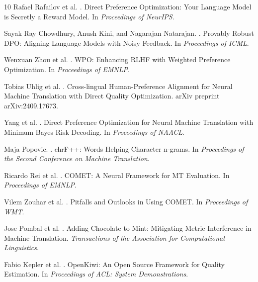 \begin{thebibliography}{10}
Rafael Rafailov et al.
.
\newblock Direct Preference Optimization: Your Language Model is Secretly a Reward Model.
\newblock In \emph{Proceedings of NeurIPS}.

Sayak Ray Chowdhury, Anush Kini, and Nagarajan Natarajan.
.
\newblock Provably Robust DPO: Aligning Language Models with Noisy Feedback.
\newblock In \emph{Proceedings of ICML}.

Wenxuan Zhou et al.
.
\newblock WPO: Enhancing RLHF with Weighted Preference Optimization.
\newblock In \emph{Proceedings of EMNLP}.

Tobias Uhlig et al.
.
\newblock Cross-lingual Human-Preference Alignment for Neural Machine Translation with Direct Quality Optimization.
\newblock arXiv preprint arXiv:2409.17673.

Yang et al.
.
\newblock Direct Preference Optimization for Neural Machine Translation with Minimum Bayes Risk Decoding.
\newblock In \emph{Proceedings of NAACL}.

Maja Popovic.
.
\newblock chrF++: Words Helping Character n-grams.
\newblock In \emph{Proceedings of the Second Conference on Machine Translation}.

Ricardo Rei et al.
.
\newblock COMET: A Neural Framework for MT Evaluation.
\newblock In \emph{Proceedings of EMNLP}.

Vilem Zouhar et al.
.
\newblock Pitfalls and Outlooks in Using COMET.
\newblock In \emph{Proceedings of WMT}.

Jose Pombal et al.
.
\newblock Adding Chocolate to Mint: Mitigating Metric Interference in Machine Translation.
\newblock \emph{Transactions of the Association for Computational Linguistics}.

Fabio Kepler et al.
.
\newblock OpenKiwi: An Open Source Framework for Quality Estimation.
\newblock In \emph{Proceedings of ACL: System Demonstrations}.

\end{thebibliography}
